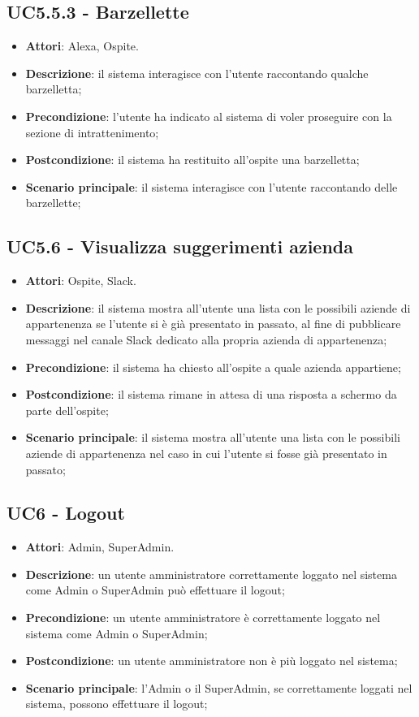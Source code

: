 \documentclass[../AnalisiDeiRequisiti_v4.0.0.tex]{subfiles}
\begin{document}
\subsection{UC5.5.3 - Barzellette} 
\label{sssec:UC5.5.3} 
\begin{itemize} 
\item \textbf{Attori}: Alexa, Ospite.
\item \textbf{Descrizione}: il sistema interagisce con l'utente raccontando qualche barzelletta;
\item \textbf{Precondizione}: l'utente ha indicato al sistema di voler proseguire con la sezione di intrattenimento;
\item \textbf{Postcondizione}: il sistema ha restituito all'ospite una barzelletta;
\item \textbf{Scenario principale}: il sistema interagisce con l'utente raccontando delle barzellette;
\end{itemize} 
\subsection{UC5.6 - Visualizza suggerimenti azienda} 
\label{sssec:UC5.6} 
\begin{itemize} 
\item \textbf{Attori}: Ospite, Slack.
\item \textbf{Descrizione}: il sistema mostra all'utente una lista con le possibili aziende di appartenenza se l'utente si è già presentato in passato, al fine di pubblicare messaggi nel canale Slack dedicato alla propria azienda di appartenenza;
\item \textbf{Precondizione}: il sistema ha chiesto all'ospite a quale azienda appartiene;
\item \textbf{Postcondizione}: il sistema rimane in attesa di una risposta a schermo da parte dell'ospite;
\item \textbf{Scenario principale}: il sistema mostra all'utente una lista con le possibili aziende di appartenenza nel caso in cui l'utente si fosse già presentato in passato;
\end{itemize} 
\subsection{UC6 - Logout} 
\label{sssec:UC6} 
\begin{itemize} 
\item \textbf{Attori}: Admin, SuperAdmin.
\item \textbf{Descrizione}: un utente amministratore correttamente loggato nel sistema come Admin o SuperAdmin può effettuare il logout;
\item \textbf{Precondizione}: un utente amministratore è correttamente loggato nel sistema come Admin o SuperAdmin;
\item \textbf{Postcondizione}: un utente amministratore non è più loggato nel sistema;
\item \textbf{Scenario principale}: l'Admin o il SuperAdmin, se correttamente loggati nel sistema, possono effettuare il logout;
\end{itemize} 
\newpage
\end{document}
